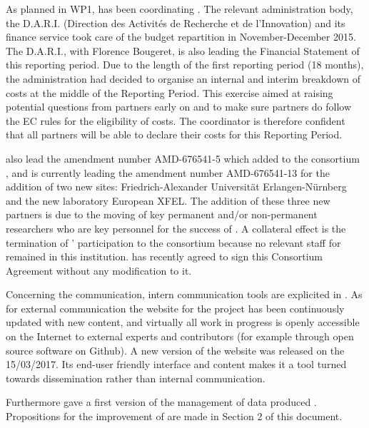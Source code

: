 \documentclass{deliverablereport}
\begin{document}
As planned in WP1,  has been coordinating \ODK.  The  relevant administration body, the D.A.R.I. (Direction des Activités de Recherche et de l'Innovation) and its finance service took care of the budget repartition in November-December 2015. The D.A.R.I., with Florence Bougeret, is also leading the Financial Statement of this reporting period. Due to the length of the first reporting period (18 months), the  administration had decided to organise an internal and interim
breakdown of costs at the middle of the Reporting Period. This exercise aimed at raising potential questions
from partners early on and to make sure partners do follow the EC
rules for the eligibility of costs. The coordinator is therefore confident that all partners will be able to declare their costs for this Reporting Period.

 also lead the amendment number AMD-676541-5 which added to the consortium , and is currently leading the amendment number AMD-676541-13 for the addition of two new sites: Friedrich-Alexander Universität Erlangen-Nürnberg and the new laboratory European XFEL. The addition of these three new partners is due to the moving of key permanent and/or non-permanent researchers who are key personnel for the success of \ODK. A collateral effect is the termination of ' participation to the consortium because no relevant staff for \ODK remained in this institution.
 has recently agreed to sign this Consortium Agreement
without any modification to it.


Concerning the communication, intern communication tools are explicited in .
As for external communication the website for the project has been continuously
updated with new content, and virtually all work in progress is openly
accessible on the Internet to external experts and contributors (for
example through open source software on Github). A new version of the website was released on the 15/03/2017. Its end-user friendly interface and content makes it a tool turned towards dissemination rather than internal communication.

 
Furthermore  gave a first version of the management of data produced \ODK. Propositions for the improvement of are made in Section 2 of this document. 


\paragraph{}
\end{document}
